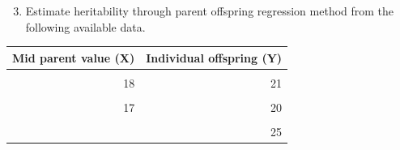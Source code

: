 \documentclass[11pt,ignorenonframetext,aspectratio=169]{beamer}
\providecommand{\tightlist}{%
  \setlength{\itemsep}{0pt}\setlength{\parskip}{0pt}}
\begin{document}
\begin{frame}{}
\protect\hypertarget{section-13}{}
\begin{enumerate}
\setcounter{enumi}{2}
\tightlist
\item
  Estimate heritability through parent offspring regression method from
  the following available data.
\end{enumerate}

\begin{table}
\centering
\begin{tabular}{rr}
\toprule
Mid parent value (X) & Individual offspring (Y)\\
\midrule
\cellcolor{gray!6}{20} & \cellcolor{gray!6}{25}\\
18 & 21\\
\cellcolor{gray!6}{15} & \cellcolor{gray!6}{20}\\
17 & 20\\
\cellcolor{gray!6}{21} & \cellcolor{gray!6}{26}\\
\addlinespace
22 & 25\\
\bottomrule
\end{tabular}
\end{table}
\end{frame}
\end{document}
